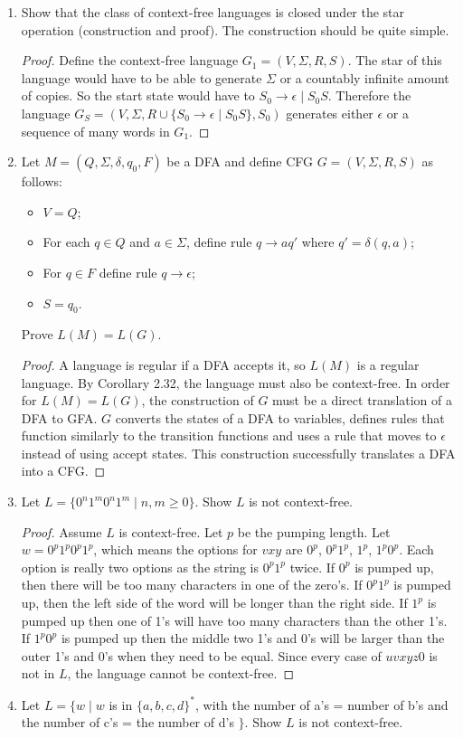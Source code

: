 \documentclass{article}
\begin{document}
\begin{enumerate}
        \item Show that the class of context-free languages is closed under the star operation (construction and proof). The construction should be quite simple.
            \begin{proof}
                Define the context-free language $G_1=(V, \Sigma, R, S)$. The star of this language would have to be able to generate $\Sigma$ or a countably infinite amount of copies. So the start state would have to $S_0\rightarrow \epsilon \mid S_0S$. Therefore the language $G_S=(V, \Sigma, R \cup \{S_0\rightarrow\epsilon\mid S_0S\}, S_0)$ generates either $\epsilon$ or a sequence of many words in $G_1$.
            \end{proof}
        \item Let $M=(Q,\Sigma, \delta, q_0, F)$ be a DFA and define CFG $G=(V,\Sigma,R,S)$ as follows:
            \begin{itemize}
                \item $V = Q$;
                \item For each $q\in Q$ and $ a\in \Sigma $, define rule $q\rightarrow aq'$ where $q'=\delta(q,a)$;
                \item For $q\in F$ define rule $q\rightarrow\epsilon$;
                \item $S=q_0$.
            \end{itemize}
            Prove $L(M) = L(G)$.
            \begin{proof}
                A language is regular if a DFA accepts it, so $L(M)$ is a regular language. By Corollary 2.32, the language must also be context-free. In order for $L(M) = L(G)$, the construction of $G$ must be a direct translation of a DFA to GFA. $G$ converts the states of a DFA to variables, defines rules that function similarly to the transition functions and uses a rule that moves to $\epsilon$ instead of using accept states. This construction successfully translates a DFA into a CFG.
            \end{proof}
        \item Let $L=\{0^n1^m0^n1^m \mid n,m \geq 0\}$. Show $L$ is not context-free.
            \begin{proof}
                Assume $L$ is context-free. Let $p$ be the pumping length. Let $w=0^p1^p0^p1^p$, which means the options for $vxy$ are $0^p$, $0^p1^p$, $1^p$, $1^p0^p$. Each option is really two options as the string is $0^p1^p$ twice. If $0^p$ is pumped up, then there will be too many characters in one of the zero's. If $0^p1^p$ is pumped up, then the left side of the word will be longer than the right side. If $1^p$ is pumped up then one of 1's will have too many characters than the other 1's. If $1^p0^p$ is pumped up then the middle two 1's and 0's will be larger than the outer 1's and 0's when they need to be equal. Since every case of $uvxyz0$ is not in $L$, the language cannot be context-free. 
            \end{proof}
        \item Let $L=\{w\mid w $ is in $\{a,b,c,d\}^*$, with the number of a's = number of b's and the number of c's = the number of d's $\}$. Show $L$ is not context-free.


\end{enumerate}
\end{document}
